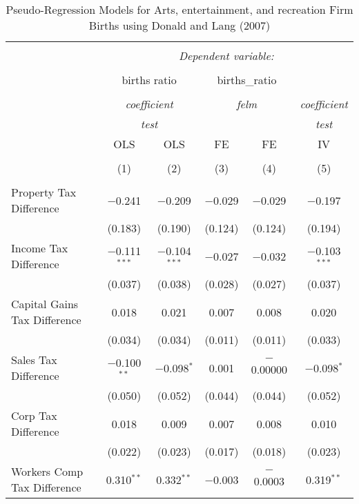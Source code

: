 
\begin{table}[!htbp] \centering 
  \caption{Pseudo-Regression Models for  Arts, entertainment, and recreation Firm Births using Donald and Lang (2007)} 
  \label{} 
\begin{tabular}{@{\extracolsep{5pt}}lccccc} 
\\[-1.8ex]\hline 
\hline \\[-1.8ex] 
 & \multicolumn{5}{c}{\textit{Dependent variable:}} \\ 
\cline{2-6} 
\\[-1.8ex] & \multicolumn{2}{c}{births ratio} & \multicolumn{2}{c}{births\_ratio} &   \\ 
\\[-1.8ex] & \multicolumn{2}{c}{\textit{coefficient}} & \multicolumn{2}{c}{\textit{felm}} & \textit{coefficient} \\ 
 & \multicolumn{2}{c}{\textit{test}} & \multicolumn{2}{c}{\textit{}} & \textit{test} \\ 
 & OLS & OLS & FE & FE & IV \\ 
\\[-1.8ex] & (1) & (2) & (3) & (4) & (5)\\ 
\hline \\[-1.8ex] 
 Property Tax Difference & $-$0.241 & $-$0.209 & $-$0.029 & $-$0.029 & $-$0.197 \\ 
  & (0.183) & (0.190) & (0.124) & (0.124) & (0.194) \\ 
  Income Tax Difference & $-$0.111$^{***}$ & $-$0.104$^{***}$ & $-$0.027 & $-$0.032 & $-$0.103$^{***}$ \\ 
  & (0.037) & (0.038) & (0.028) & (0.027) & (0.037) \\ 
  Capital Gains Tax Difference & 0.018 & 0.021 & 0.007 & 0.008 & 0.020 \\ 
  & (0.034) & (0.034) & (0.011) & (0.011) & (0.033) \\ 
  Sales Tax Difference & $-$0.100$^{**}$ & $-$0.098$^{*}$ & 0.001 & $-$0.00000 & $-$0.098$^{*}$ \\ 
  & (0.050) & (0.052) & (0.044) & (0.044) & (0.052) \\ 
  Corp Tax Difference & 0.018 & 0.009 & 0.007 & 0.008 & 0.010 \\ 
  & (0.022) & (0.023) & (0.017) & (0.018) & (0.023) \\ 
  Workers Comp Tax Difference & 0.310$^{**}$ & 0.332$^{**}$ & $-$0.003 & $-$0.0003 & 0.319$^{**}$ \\ 

\end{tabular}
\end{table}
